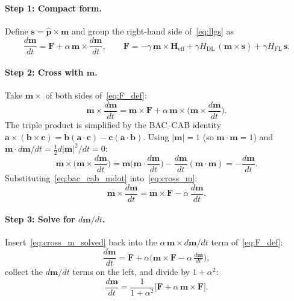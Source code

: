 \documentclass[11pt,a4paper]{article}
\newcommand{\mb}[1]{\mathbf{#1}}
\newcommand{\phat}{\hat{\mb{p}}}
\newcommand{\Heff}{\mb{H}_{\text{eff}}}
\begin{document}
\paragraph{Step 1: Compact form.}
Define $\mb{s} = \phat\times\mb{m}$ and group
the right-hand side of~\eqref{eq:llgs} as
%
\begin{equation}\label{eq:F_def}
\frac{d\mb{m}}{dt} = \mb{F} + \alpha\,\mb{m}\times\frac{d\mb{m}}{dt},
\qquad
\mb{F} = -\gamma\,\mb{m}\times\Heff
        + \gamma H_{\text{DL}}\,(\mb{m}\times\mb{s})
        + \gamma H_{\text{FL}}\,\mb{s}.
\end{equation}

\paragraph{Step 2: Cross with $\mb{m}$.}
Take $\mb{m}\times$ of both sides of~\eqref{eq:F_def}:
%
\begin{equation}\label{eq:cross_m}
\mb{m}\times\frac{d\mb{m}}{dt}
    = \mb{m}\times\mb{F}
        + \alpha\,\mb{m}\times\Big(\mb{m}\times\frac{d\mb{m}}{dt}\Big).
\end{equation}
%
The triple product is simplified by the BAC--CAB identity
$\mb{a}\times(\mb{b}\times\mb{c}) = \mb{b}(\mb{a}\cdot\mb{c})
- \mb{c}(\mb{a}\cdot\mb{b})$. Using $|\mb{m}|=1$ (so
$\mb{m}\cdot\mb{m}=1$) and
$\mb{m}\cdot d\mb{m}/dt = \tfrac{1}{2}d|\mb{m}|^2/dt = 0$:
%
\begin{equation}\label{eq:bac_cab_mdot}
\mb{m}\times\Big(\mb{m}\times\frac{d\mb{m}}{dt}\Big)
    = \mb{m}\Big(\mb{m}\cdot\frac{d\mb{m}}{dt}\Big)
    - \frac{d\mb{m}}{dt}(\mb{m}\cdot\mb{m})
    = -\frac{d\mb{m}}{dt}.
\end{equation}
%
Substituting~\eqref{eq:bac_cab_mdot} into~\eqref{eq:cross_m}:
%
\begin{equation}\label{eq:cross_m_solved}
\mb{m}\times\frac{d\mb{m}}{dt}
    = \mb{m}\times\mb{F} - \alpha\,\frac{d\mb{m}}{dt}.
\end{equation}

\paragraph{Step 3: Solve for $d\mb{m}/dt$.}
Insert~\eqref{eq:cross_m_solved} back into the
$\alpha\,\mb{m}\times d\mb{m}/dt$ term of~\eqref{eq:F_def}:
%
\begin{equation}
\frac{d\mb{m}}{dt}
    = \mb{F} + \alpha\big(\mb{m}\times\mb{F} - \alpha\,\tfrac{d\mb{m}}{dt}\big),
\end{equation}
%
collect the $d\mb{m}/dt$ terms on the left, and divide by
$1+\alpha^2$:
%
\begin{equation}\label{eq:llgs_F_explicit}
\boxed{\;
\frac{d\mb{m}}{dt}
    = \frac{1}{1+\alpha^2}\Big[\mb{F} + \alpha\,\mb{m}\times\mb{F}\Big].
\;}
\end{equation}
\end{document}

